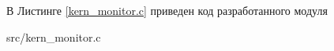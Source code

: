\chapter{}
В Листинге \ref{kern_monitor.c} приведен код разработанного модуля

\begin{lstinputlisting}[
	caption={Код модуля},
	label={kern_monitor.c}
	]{src/kern_monitor.c}
\end{lstinputlisting}
	



%


